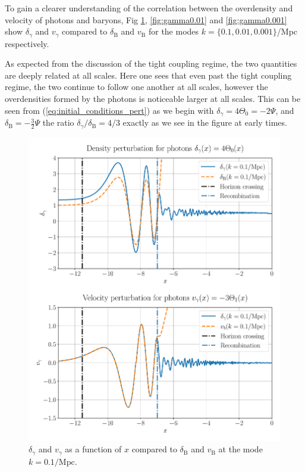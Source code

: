\documentclass[%
reprint,
 amsmath,amssymb,
 aps,
]{revtex4-2}
\begin{document}
To gain a clearer understanding of the correlation between the overdensity and velocity of photons and baryons, Fig \ref{fig:gamma0.1}, \ref{fig:gamma0.01} and \ref{fig:gamma0.001} show $\delta_\gamma$ and $v_\gamma$ compared to $\delta_\text{B}$ and $v_\text{B}$ for the modes $k=\{0.1,0.01,0.001\}$/Mpc respectively. 

As expected from the discussion of the tight coupling regime, the two quantities are deeply related at all scales. Here one sees that even past the tight coupling regime, the two continue to follow one another at all scales, however the overdensities formed by the photons is noticeable larger at all scales. This can be seen from (\ref{eq:initial_conditions_pert}) as we begin with $\delta_\gamma=4\Theta_0=-2\Psi$, and $\delta_\text{B}=-\frac{3}{2}\Psi$ the ratio $\delta_\gamma/\delta_\text{B}=4/3$ exactly as we see in the figure at early times. 

\begin{figure}[ht!]
	\includegraphics[width = \linewidth]{Figures/gamma0.1.pdf}
	\caption{$\delta_\gamma$ and $v_\gamma$ as a function of $x$ compared to $\delta_\text{B}$ and $v_\text{B}$ at the mode $k=0.1/\text{Mpc}$.}
	\label{fig:gamma0.1}
\end{figure}
\end{document}
